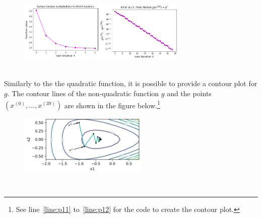 \begin{figure}[h!]
    \centering
        \includegraphics[width=0.72\textwidth]{Pictures/Merged_conv_exponential.png}
    \label{fig:convergence2}
\end{figure}\\
Similarly to the the quadratic function, it is possible to provide a contour plot for $g.$ The contour lines of the non-quadratic function $g$ and the points $(x^{(0)},\ldots,x^{(39)})$ are shown in the figure below.\footnote{See line~\ref{line:p11} to~\ref{line:p12} for the code to create the contour plot.}
\begin{figure}[h!]
    \centering
        \includegraphics[width=0.55\textwidth]{Pictures/Level sets of exponential.png}
    \label{fig:levelsets2}
\end{figure}\\
\newpage
